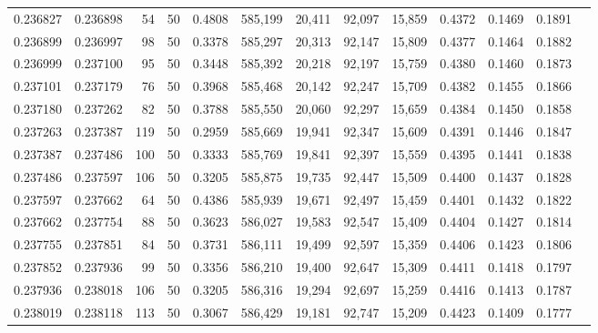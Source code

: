 \begin{tabular}{rrrrrrrrrrrrr}
0.236827 & 0.236898 &    54 &  50 &                                     0.4808 & 585,199 &  20,411 &  92,097 &  15,859 & 0.4372 & 0.1469 & 0.1891 \\
0.236899 & 0.236997 &    98 &  50 &                                     0.3378 & 585,297 &  20,313 &  92,147 &  15,809 & 0.4377 & 0.1464 & 0.1882 \\
0.236999 & 0.237100 &    95 &  50 &                                     0.3448 & 585,392 &  20,218 &  92,197 &  15,759 & 0.4380 & 0.1460 & 0.1873 \\
0.237101 & 0.237179 &    76 &  50 &                                     0.3968 & 585,468 &  20,142 &  92,247 &  15,709 & 0.4382 & 0.1455 & 0.1866 \\
0.237180 & 0.237262 &    82 &  50 &                                     0.3788 & 585,550 &  20,060 &  92,297 &  15,659 & 0.4384 & 0.1450 & 0.1858 \\
0.237263 & 0.237387 &   119 &  50 &                                     0.2959 & 585,669 &  19,941 &  92,347 &  15,609 & 0.4391 & 0.1446 & 0.1847 \\
0.237387 & 0.237486 &   100 &  50 &                                     0.3333 & 585,769 &  19,841 &  92,397 &  15,559 & 0.4395 & 0.1441 & 0.1838 \\
0.237486 & 0.237597 &   106 &  50 &                                     0.3205 & 585,875 &  19,735 &  92,447 &  15,509 & 0.4400 & 0.1437 & 0.1828 \\
0.237597 & 0.237662 &    64 &  50 &                                     0.4386 & 585,939 &  19,671 &  92,497 &  15,459 & 0.4401 & 0.1432 & 0.1822 \\
0.237662 & 0.237754 &    88 &  50 &                                     0.3623 & 586,027 &  19,583 &  92,547 &  15,409 & 0.4404 & 0.1427 & 0.1814 \\
0.237755 & 0.237851 &    84 &  50 &                                     0.3731 & 586,111 &  19,499 &  92,597 &  15,359 & 0.4406 & 0.1423 & 0.1806 \\
0.237852 & 0.237936 &    99 &  50 &                                     0.3356 & 586,210 &  19,400 &  92,647 &  15,309 & 0.4411 & 0.1418 & 0.1797 \\
0.237936 & 0.238018 &   106 &  50 &                                     0.3205 & 586,316 &  19,294 &  92,697 &  15,259 & 0.4416 & 0.1413 & 0.1787 \\
0.238019 & 0.238118 &   113 &  50 &                                     0.3067 & 586,429 &  19,181 &  92,747 &  15,209 & 0.4423 & 0.1409 & 0.1777 \\

\end{tabular}
